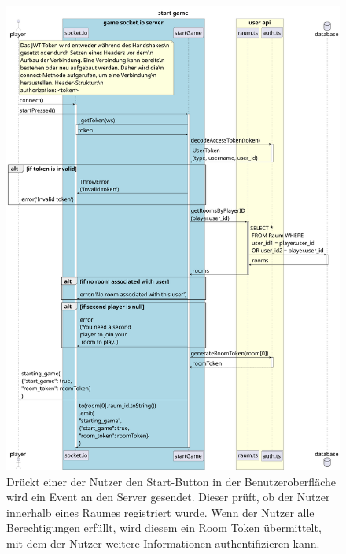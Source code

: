 \documentclass[
]{article}
\begin{document}
\begin{figure}[H]
	\centering
	\includegraphics[width=\textwidth ]{resources/start_game.pdf}
	\caption{Drückt einer der Nutzer den Start-Button in der Benutzeroberfläche wird ein Event an den Server gesendet. Dieser prüft, ob der Nutzer innerhalb eines Raumes registriert wurde. Wenn der Nutzer alle Berechtigungen erfüllt, wird diesem ein Room Token übermittelt, mit dem der Nutzer weitere Informationen authentifizieren kann.}
	\label{fig:ablaufdiagramm-start_game}
\end{figure}
\end{document}

